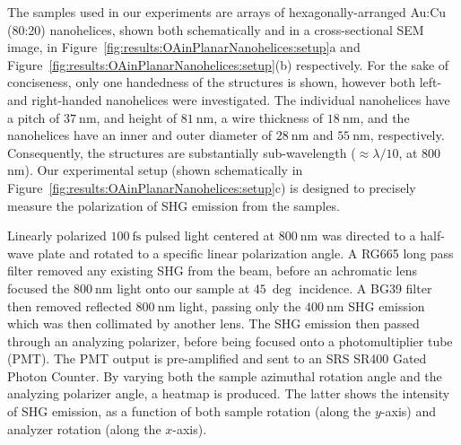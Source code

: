 The samples used in our experiments are arrays of hexagonally-arranged Au:Cu (80:20) nanohelices,\cite{Gibbs2014} shown both schematically and in a cross-sectional SEM image, in Figure~\ref{fig:results:OAinPlanarNanohelices:setup}a and Figure~\ref{fig:results:OAinPlanarNanohelices:setup}(b) respectively. 
For the sake of conciseness, only one handedness of the structures is shown, however both left- and right-handed nanohelices were investigated. The individual nanohelices have a pitch of $\SI{37}{\nano\m}$, and height of $\SI{81}{\nano\m}$, a wire thickness of $\SI{18}{\nano\m}$, and the nanohelices have an inner and outer diameter of $\SI{28}{\nano\m}$ and $\SI{55}{\nano\m}$, respectively. Consequently, the structures are substantially sub-wavelength ($\approx\lambda/10$, at 800 nm).
Our experimental setup (shown schematically in Figure~\ref{fig:results:OAinPlanarNanohelices:setup}c) is designed to precisely measure the polarization of SHG emission from the samples. 

Linearly polarized $\SI{100}{\femto\s}$ pulsed light centered at $\SI{800}{\nano\m}$ was directed to a half-wave plate and rotated to a specific linear polarization angle. A RG665 long pass filter removed any existing SHG from the beam, before an achromatic lens focused the $\SI{800}{\nano\m}$ light onto our sample at $\SI{45}{\deg}$ incidence. A BG39 filter then removed reflected $\SI{800}{\nano\m}$ light, passing only the $\SI{400}{\nano\m}$ SHG emission which was then collimated by another lens. The SHG emission then passed through an analyzing polarizer, before being focused onto a photomultiplier tube (PMT). The PMT output is pre-amplified and sent to an SRS SR400 Gated Photon Counter. 
By varying both the sample azimuthal rotation angle and the analyzing polarizer angle, a heatmap is produced. The latter shows the intensity of SHG emission, as a function of both sample rotation (along the $y$-axis) and analyzer rotation (along the $x$-axis). 

